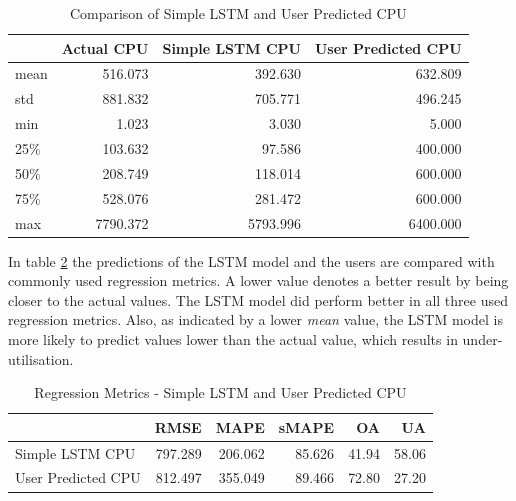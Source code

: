       \begin{table}
        \centering
        \caption{Comparison of Simple LSTM and User Predicted CPU}
        \label{tab:comparison-simple-lstm-user-predicted-cpu}
        \begin{tabular}{|l|rrr|}
          \toprule
          {} &  Actual CPU &  Simple LSTM CPU &  User Predicted CPU \\
          \midrule
          mean  &           516.073 &              392.630 &        632.809 \\
          std   &           881.832 &              705.771 &        496.245 \\
          min   &             1.023 &                3.030 &          5.000 \\
          25\%   &           103.632 &               97.586 &        400.000 \\
          50\%   &           208.749 &              118.014 &        600.000 \\
          75\%   &           528.076 &              281.472 &        600.000 \\
          max   &          7790.372 &             5793.996 &       6400.000 \\
          \bottomrule
          \end{tabular}
      \end{table}
      In table \ref{tab:regression-metrics-simple-lstm-user-predicted-cpu} the predictions of the LSTM model and the users are compared with commonly used regression metrics. A lower value denotes a better result by being closer to the actual values. The LSTM model did perform better in all three used regression metrics. Also, as indicated by a lower \emph{mean} value, the LSTM model is more likely to predict values lower than the actual value, which results in under-utilisation.

      \begin{table}
        \centering
        \caption{Regression Metrics - Simple LSTM and User Predicted CPU}
        \label{tab:regression-metrics-simple-lstm-user-predicted-cpu}
        \begin{tabular}{|l|rrrrr|}
          \toprule
          {} &     RMSE &     MAPE &   sMAPE &     OA &     UA \\
          \midrule
          Simple LSTM CPU &  797.289 &  206.062 &  85.626 &  41.94 &  58.06 \\
          User Predicted CPU &  812.497 &  355.049 &  89.466 &  72.80 &  27.20 \\
          \bottomrule
        \end{tabular}
      \end{table}

